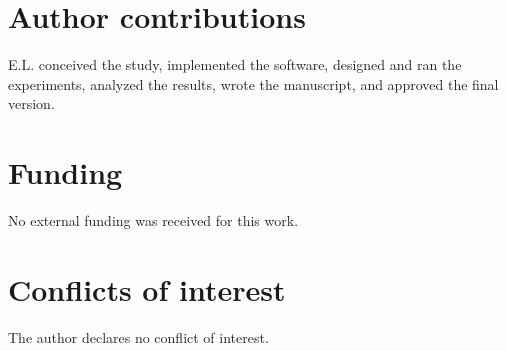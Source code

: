 \documentclass[10pt]{article}
\begin{document}



\section*{Author contributions}

E.L. conceived the study, implemented the software, designed and ran the
experiments, analyzed the results, wrote the manuscript, and approved the final
version.

\section*{Funding}

No external funding was received for this work.

\section*{Conflicts of interest}

The author declares no conflict of interest.
\end{document}
